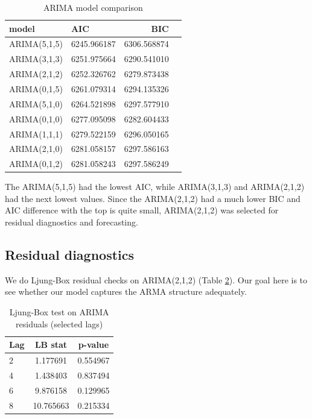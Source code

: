 \documentclass[letterpaper]{article} %
\begin{document}
\begin{table}[ht]
\centering
\caption{ARIMA model comparison}
\label{tab:arima_comparison}
\begin{tabular}{llrr}
\toprule
\textbf{model} & \textbf{AIC} & \textbf{BIC} \\
\midrule
ARIMA(5,1,5) & 6245.966187 & 6306.568874 \\
ARIMA(3,1,3) & 6251.975664 & 6290.541010 \\
ARIMA(2,1,2) & 6252.326762 & 6279.873438 \\
ARIMA(0,1,5) & 6261.079314 & 6294.135326 \\
ARIMA(5,1,0) & 6264.521898 & 6297.577910 \\
ARIMA(0,1,0) & 6277.095098 & 6282.604433 \\
ARIMA(1,1,1) & 6279.522159 & 6296.050165 \\
ARIMA(2,1,0) & 6281.058157 & 6297.586163 \\
ARIMA(0,1,2) & 6281.058243 & 6297.586249 \\
\bottomrule
\end{tabular}
\end{table}

The ARIMA(5,1,5) had the lowest AIC, while ARIMA(3,1,3) and ARIMA(2,1,2) had the next lowest values. Since the ARIMA(2,1,2) had a much lower BIC and AIC difference with the top is quite small, ARIMA(2,1,2) was selected for residual diagnostics and forecasting.

\subsection{Residual diagnostics}
We do Ljung-Box residual checks on ARIMA(2,1,2) (Table \ref{tab:ljung_box}). Our goal here is to see whether our model captures the ARMA structure adequately.

\begin{table}[tb]
\centering
\small
\caption{Ljung-Box test on ARIMA residuals (selected lags)}
\label{tab:ljung_box}
\begin{tabular}{@{}lcc@{}}
\toprule
\textbf{Lag} & \textbf{LB stat} & \textbf{p-value} \\
\midrule
2 & 1.177691 & 0.554967 \\
4 & 1.438403 & 0.837494 \\
6 & 9.876158 & 0.129965 \\
8 & 10.765663 & 0.215334 \\
\bottomrule
\end{tabular}
\end{table}
\end{document}
